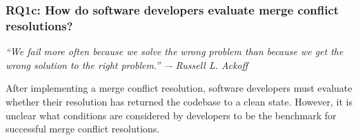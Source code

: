 \subsubsection{\textbf{RQ1c}: How do software developers \textbf{evaluate} merge conflict resolutions?}\label{RQ1c}

\vspace*{-0.5\baselineskip}
\begin{quoting}
\textit{``We fail more often because we solve the wrong problem than because we get the wrong solution to the right problem.'' –- Russell L. Ackoff}
\end{quoting}
\vspace*{+0.3\baselineskip}

After implementing a merge conflict resolution, software developers must evaluate whether their resolution has returned the codebase to a clean state.
However, it is unclear what conditions are considered by developers to be the benchmark for successful merge conflict resolutions.


